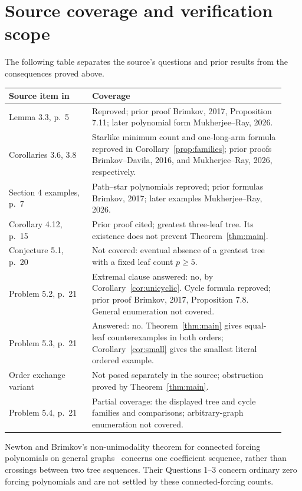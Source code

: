 \documentclass[11pt]{article}
\begin{document}
\section{Source coverage and verification scope}
The following table separates the source's questions and prior results
from the consequences proved above.
\begin{center}
\small
\begin{tabular}{@{}p{0.28\linewidth}p{0.65\linewidth}@{}}
\toprule
Source item in~\cite{MR} & Coverage\\
\midrule
Lemma 3.3, p.~5 & Reproved; prior proof Brimkov, 2017, Proposition 7.11;
later polynomial form Mukherjee--Ray, 2026.\\
Corollaries 3.6, 3.8 & Starlike minimum count and one-long-arm formula
reproved in Corollary~\ref{prop:families}; prior proofs
Brimkov--Davila, 2016, and Mukherjee--Ray, 2026, respectively.\\
Section 4 examples, p.~7 & Path--star polynomials reproved;
prior formulas Brimkov, 2017; later examples Mukherjee--Ray, 2026.\\
Corollary 4.12, p.~15 & Prior proof cited; greatest three-leaf tree.
Its existence does not prevent Theorem~\ref{thm:main}.\\
Conjecture 5.1, p.~20 & Not covered: eventual absence of a greatest
tree with a fixed leaf count $p\geq5$.\\
Problem 5.2, p.~21 & Extremal clause answered: no, by
Corollary~\ref{cor:unicyclic}. Cycle formula reproved; prior proof
Brimkov, 2017, Proposition 7.8. General enumeration not covered.\\
Problem 5.3, p.~21 & Answered: no. Theorem~\ref{thm:main} gives
equal-leaf counterexamples in both orders; Corollary~\ref{cor:small}
gives the smallest literal ordered example.\\
Order exchange variant & Not posed separately in the source;
obstruction proved by Theorem~\ref{thm:main}.\\
Problem 5.4, p.~21 & Partial coverage: the displayed tree and cycle
families and comparisons; arbitrary-graph enumeration not covered.\\
\bottomrule
\end{tabular}
\end{center}
Newton and Brimkov's non-unimodality theorem for connected forcing
polynomials on general graphs~\cite[Corollary 2]{NB} concerns one
coefficient sequence, rather than crossings between two tree sequences.
Their Questions 1--3 concern ordinary zero forcing polynomials and are
not settled by these connected-forcing counts.
\end{document}

